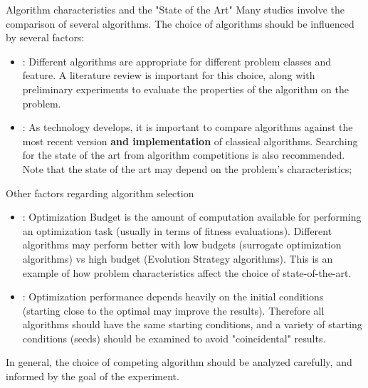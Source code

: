 \documentclass[aspectratio=169]{beamer}
\begin{document}
\begin{frame}[t]{Algorithm characteristics and the "State of the Art"}
  Many studies involve the comparison of several algorithms. The choice of algorithms should be influenced by several factors:
  \begin{itemize}
    \item {}: Different algorithms are appropriate for different problem classes and feature. A literature review is important for this choice, along with preliminary experiments to evaluate the properties of the algorithm on the problem.\medskip 
    
    \item {}: As technology develops, it is important to compare algorithms against the most recent version {\bf and implementation} of classical algorithms. Searching for the state of the art from algorithm competitions is also recommended. Note that the state of the art may depend on the problem's characteristics;
  \end{itemize}
\end{frame}

\begin{frame}{Other factors regarding algorithm selection}
  \begin{itemize}
    \item {}: Optimization Budget is the amount of computation available for performing an optimization task (usually in terms of fitness evaluations). Different algorithms may perform better with low budgets (surrogate optimization algorithms) vs high budget (Evolution Strategy algorithms). This is an example of how problem characteristics affect the choice of state-of-the-art.

    \item {}: Optimization performance depends heavily on the initial conditions (starting close to the optimal may improve the results). Therefore all algorithms should have the same starting conditions, and a variety of starting conditions (seeds) should be examined to avoid "coincidental" results.
  \end{itemize}\bigskip

  In general, the choice of competing algorithm should be analyzed carefully, and informed by the goal of the experiment.
\end{frame}


\end{document}
